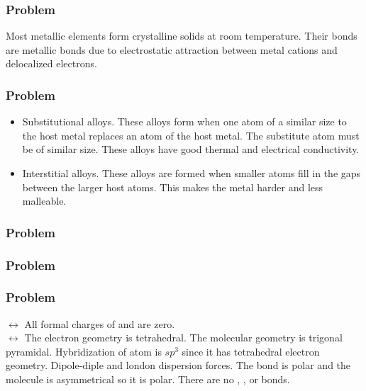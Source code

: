 \documentclass{article}
\begin{document}
\subsubsection*{Problem \countThis}
Most metallic elements form crystalline solids at room temperature. Their bonds are metallic bonds due to electrostatic attraction between metal cations and delocalized electrons. 
\subsubsection*{Problem \countThis}
\begin{itemize}
    \item Substitutional alloys. These alloys form when one atom of a similar size to the host metal replaces an atom of the host metal. The substitute atom must be of similar size. These alloys have good thermal and electrical conductivity.
    \item Interstitial alloys. These alloys are formed when smaller atoms fill in the gaps between the larger host atoms. This makes the metal harder and less malleable. 
\end{itemize}
\subsubsection*{Problem \countThis}
\subsubsection*{Problem \countThis}
\subsubsection*{Problem \countThis}
\(\longleftrightarrow\)
\AnswerSet
All formal charges of  and  are zero. \\
\(\longleftrightarrow\)
\AnswerSet
The electron geometry is tetrahedral. The molecular geometry is trigonal pyramidal. Hybridization of  atom is \(sp^3\) since it has tetrahedral electron geometry.
\AnswerSet
Dipole-diple and london dispersion forces. The  bond is polar and the molecule is asymmetrical so it is polar. There are no , , or  bonds. 
\end{document}
